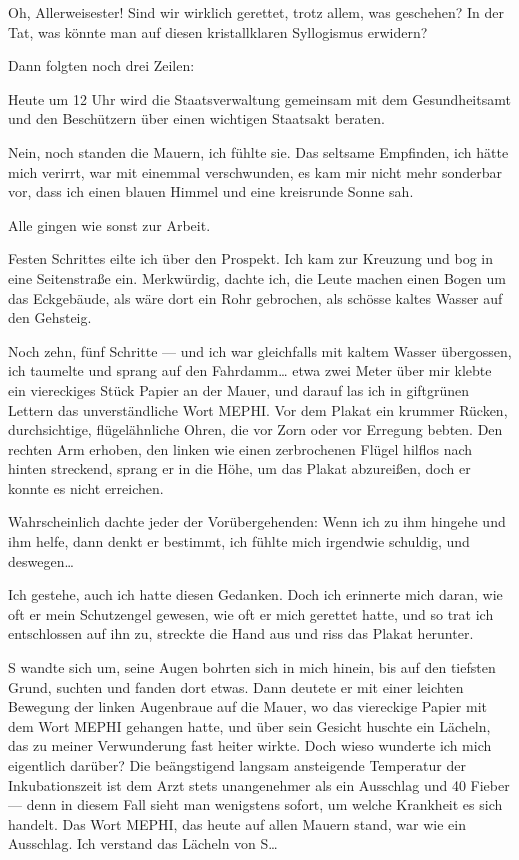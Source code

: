 Oh, Allerweisester!
Sind wir wirklich gerettet, trotz allem, was geschehen? In der Tat,
was könnte man auf diesen kristallklaren Syllogismus erwidern?

Dann folgten noch drei Zeilen:

\begin{meldung}
Heute um 12 Uhr wird die Staatsverwaltung gemeinsam mit dem
Gesundheitsamt und den Beschützern über einen wichtigen Staatsakt
beraten.
\end{meldung}

Nein, noch standen die Mauern, ich fühlte sie. Das seltsame
Empfinden, ich hätte mich verirrt, war mit einemmal verschwunden,
es kam mir nicht mehr sonderbar vor, dass ich einen blauen Himmel
und eine kreisrunde Sonne sah.

Alle gingen wie sonst zur Arbeit.

Festen Schrittes eilte ich über den Prospekt. Ich kam zur Kreuzung
und bog in eine Seitenstraße ein. Merkwürdig, dachte ich, die Leute
machen einen Bogen um das Eckgebäude, als wäre dort ein Rohr
gebrochen, als schösse kaltes Wasser auf den Gehsteig.

Noch zehn, fünf Schritte — und ich war gleichfalls mit kaltem
Wasser übergossen, ich taumelte und sprang auf den Fahrdamm\ldots{} etwa
zwei Meter über mir klebte ein viereckiges Stück Papier an der
Mauer, und darauf las ich in giftgrünen Lettern das unverständliche
Wort MEPHI. Vor dem Plakat ein krummer Rücken, durchsichtige,
flügelähnliche Ohren, die vor Zorn oder vor Erregung bebten. Den
rechten Arm erhoben, den linken wie einen zerbrochenen Flügel
hilflos nach hinten streckend, sprang er in die Höhe, um das Plakat
abzureißen, doch er konnte es nicht erreichen.

Wahrscheinlich dachte jeder der Vorübergehenden: Wenn ich zu ihm
hingehe und ihm helfe, dann denkt er bestimmt, ich fühlte mich
irgendwie schuldig, und deswegen\ldots{}

Ich gestehe, auch ich hatte
diesen Gedanken. Doch ich erinnerte mich daran, wie oft er mein
Schutzengel gewesen, wie oft er mich gerettet hatte, und so trat
ich entschlossen auf ihn zu, streckte die Hand aus und riss das
Plakat herunter.

S wandte sich um, seine Augen bohrten sich in mich hinein, bis auf
den tiefsten Grund, suchten und fanden dort etwas. Dann deutete er
mit einer leichten Bewegung der linken Augenbraue auf die Mauer, wo
das viereckige Papier mit dem Wort MEPHI gehangen hatte, und über
sein Gesicht huschte ein Lächeln, das zu meiner Verwunderung fast
heiter wirkte. Doch wieso wunderte ich mich eigentlich darüber? Die
beängstigend langsam ansteigende Temperatur der Inkubationszeit ist
dem Arzt stets unangenehmer als ein Ausschlag und 40\textcelsius{} Fieber — denn
in diesem Fall sieht man wenigstens sofort, um welche Krankheit es
sich handelt. Das Wort MEPHI, das heute auf allen Mauern stand, war
wie ein Ausschlag. Ich verstand das Lächeln von S\ldots{}

